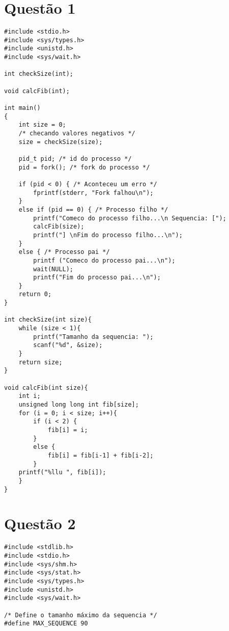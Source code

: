 \documentclass[
	article,			%
	11pt,				%
	oneside,			%
	a4paper,			%
	english,			%
	brazil,				%
	sumario=tradicional
	]{abntex2}
\begin{document}
\begin{anexosenv}

\chapter{Questão 1}

\begin{lstlisting}
#include <stdio.h>
#include <sys/types.h>
#include <unistd.h>
#include <sys/wait.h>

int checkSize(int);

void calcFib(int);

int main()
{
    int size = 0;
    /* checando valores negativos */
    size = checkSize(size);

    pid_t pid; /* id do processo */
    pid = fork(); /* fork do processo */

    if (pid < 0) { /* Aconteceu um erro */
        fprintf(stderr, "Fork falhou\n");
    }
    else if (pid == 0) { /* Processo filho */
        printf("Comeco do processo filho...\n Sequencia: [");
        calcFib(size);
        printf("] \nFim do processo filho...\n");
    }
    else { /* Processo pai */
        printf ("Comeco do processo pai...\n");
        wait(NULL);
        printf("Fim do processo pai...\n");
    }
    return 0;
}

int checkSize(int size){
    while (size < 1){
        printf("Tamanho da sequencia: ");
        scanf("%d", &size);
    }
    return size;
}

void calcFib(int size){
    int i;
    unsigned long long int fib[size];
    for (i = 0; i < size; i++){
        if (i < 2) {
            fib[i] = i;
        }
        else {
            fib[i] = fib[i-1] + fib[i-2];
        }
    printf("%llu ", fib[i]);
    }
}
\end{lstlisting}
\newpage

\chapter{Questão 2}

\begin{lstlisting}
#include <stdlib.h>
#include <stdio.h>
#include <sys/shm.h>
#include <sys/stat.h>
#include <sys/types.h>
#include <unistd.h>
#include <sys/wait.h>

/* Define o tamanho máximo da sequencia */
#define MAX_SEQUENCE 90


\end{lstlisting}
\end{anexosenv}
\end{document}
